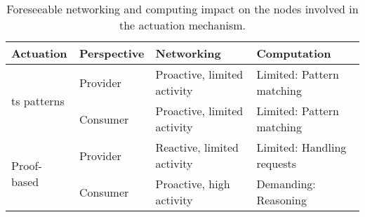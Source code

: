 
\begin{table}[htbp]
  \caption{Foreseeable networking and computing impact on the nodes involved in the actuation mechanism.}
  \begin{center}
    \footnotesize
    \begin{tabular}{llp{4cm}p{4cm}}
      Actuation &
      Perspective &
      Networking &
      Computation \\
      \hline
      \multirow{2}{*}{\ac{ts} patterns} & Provider & Proactive, limited activity & Limited: Pattern matching \\
				    ~ & Consumer & Proactive, limited activity & Limited: Pattern matching \\
      \multirow{2}{*}{Proof-based} & Provider & Reactive, limited activity & Limited: Handling requests \\
                                  ~ & Consumer & Proactive, high activity &  Demanding: Reasoning \\ %
      \hline
    \end{tabular}
  \end{center}
  \label{tab:actuation_networking_computing}
\end{table}